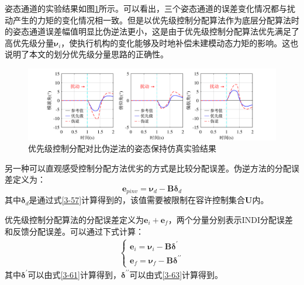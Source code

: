 姿态通道的实验结果如图\ref{优先级伪逆姿态仿真}所示。可以看出，三个姿态通道的误差变化情况都与扰动产生的力矩的变化情况相一致。但是以优先级控制分配算法作为底层分配算法时的姿态通道误差幅值明显比伪逆法更小，这是由于优先级控制分配算法优先满足了高优先级分量$\boldsymbol{\nu}_i$，使执行机构的变化能够及时地补偿未建模动态力矩的影响。这也说明了本文的划分优先级分量思路的正确性。
\begin{figure}[htbp]
	\centering
	\begin{minipage}[c]{1\textwidth}
        \centering
        \includegraphics[scale=1]{Fig/优先级对比伪逆的姿态保持仿真实验结果.pdf}
        \caption{\label{优先级伪逆姿态仿真}优先级控制分配对比伪逆法的姿态保持仿真实验结果}
        \end{minipage}
\end{figure}

另一种可以直观感受控制分配方法优劣的方式是比较分配误差。伪逆方法的分配误差定义为：
\begin{equation}
    \boldsymbol{e}_{pinv}=\boldsymbol{\nu}_d-\boldsymbol{B}\boldsymbol{\delta}_d
    \label{3-66}
\end{equation}
其中$\boldsymbol{\delta}_d$是通过式\eqref{3-57}计算得到的，该值需要被限制在容许控制集合$\boldsymbol{U}$内。

优先级控制分配算法的分配误差定义为$\boldsymbol{e}_{i}+\boldsymbol{e}_{f}$，两个分量分别表示INDI分配误差和反馈分配误差。可以通过下式计算：
\begin{equation}
    \begin{gathered}
        \begin{cases}
            \boldsymbol{e}_{i}=\boldsymbol{\nu}_i-\boldsymbol{B}\boldsymbol{\delta}^{\prime} \\
            \boldsymbol{e}_{f}=\boldsymbol{\nu}_f-\boldsymbol{B}\boldsymbol{\delta}^{\prime\prime}
        \end{cases}
    \end{gathered}
    \label{3-67}
\end{equation}
其中$\boldsymbol{\delta}^{\prime}$可以由式\eqref{3-61}计算得到，$\boldsymbol{\delta}^{\prime\prime}$可以由式\eqref{3-63}计算得到。

